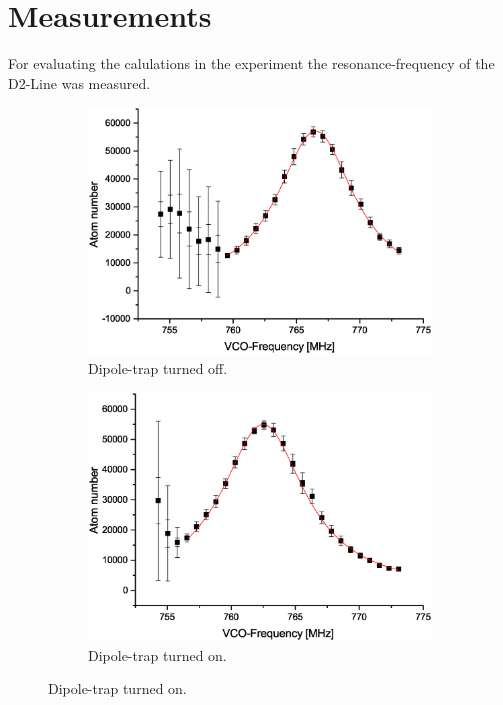 \chapter{Measurements}
For evaluating the calulations in the experiment the resonance-frequency of the D2-Line was measured. 

\begin{figure}[h]
\centering
\begin{subfigure}[b]{0.48\textwidth}
                \includegraphics[width=\textwidth]{withoutodt}
                \caption{Dipole-trap turned off.}
\end{subfigure}
\begin{subfigure}[b]{0.48\textwidth}
               \includegraphics[width=\textwidth]{withodt}
                \caption{Dipole-trap turned on.}
\end{subfigure}



\end{figure}
